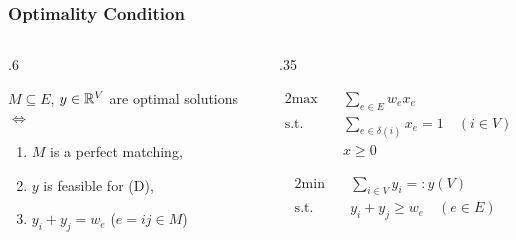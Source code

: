 \documentclass[14pt,aspectratio=169,xcolor=dvipsnames,table,onlytextwidth]{beamer}
\begin{document}
\begin{frame}
    \frametitle{Optimality Condition}

    \begin{columns}[T]
    \begin{column}{.6\textwidth}
        \begin{lemma}
        $M \subseteq E$, $y \in \mathbb{R}^V$ are optimal solutions
        $\iff$
        \begin{enumerate}
            \item $M$ is a perfect matching,
            \item $y$ is feasible for (D),
            \item $y_i + y_j = w_e$ \quad ($e = ij \in M$)
        \end{enumerate}
        \end{lemma}
        
    \end{column}
    \begin{column}{.35\textwidth}
        \footnotesize
        \begin{primal}
        \begin{alignat*}{2}
            \text{max} & \quad  \sum_{e \in E} w_e x_e \\
            \text{s.t.} & \quad \sum_{e \in \delta(i)} x_e = 1  \quad (i \in V) \\
            & \quad x \geq 0
        \end{alignat*}
    \end{primal}
    \begin{dual}
        \setlength{\abovedisplayskip}{0pt}
        \begin{alignat*}{2}
            \text{min} & \quad  \sum_{i \in V} y_i =: y(V) \\
            \text{s.t.} & \quad y_i + y_j \geq w_e \quad (e \in E)
        \end{alignat*}
    \end{dual}
    \end{column}
    \end{columns}

\end{frame}
\end{document}
